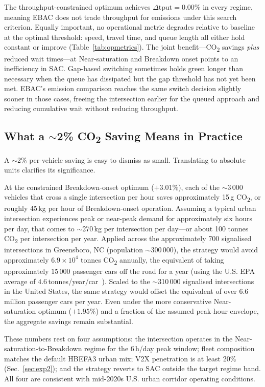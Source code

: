 \documentclass[review,3p,authoryear,times]{elsarticle}
\begin{document}
The throughput-constrained optimum achieves $\Delta\text{tput}=0.00\%$ in
every regime, meaning EBAC does not trade throughput for emissions under this
search criterion. Equally important, no operational metric degrades relative
to baseline at the optimal threshold: speed, travel time, and queue length
all either hold constant or improve (Table~\ref{tab:opmetrics}). The joint
benefit---CO\textsubscript{2} savings \emph{plus} reduced wait times---at
Near-saturation and Breakdown onset points to an inefficiency in SAC.
Gap-based switching sometimes holds green longer than necessary when the
queue has dissipated but the gap threshold has not yet been met. EBAC's
emission comparison reaches the same switch decision slightly sooner in those
cases, freeing the intersection earlier for the queued approach and reducing
cumulative wait without reducing throughput.

\subsection{What a $\sim$2\% CO\textsubscript{2} Saving Means in Practice}
\label{sec:realworld}

A $\sim$2\% per-vehicle saving is easy to dismiss as small. Translating to
absolute units clarifies its significance.

At the constrained Breakdown-onset optimum ($+3.01\%$), each of the
$\sim$3\,000 vehicles that cross a single intersection per hour saves
approximately 15\,g CO\textsubscript{2}, or roughly 45\,kg per hour of
Breakdown-onset operation. Assuming a typical urban intersection experiences
peak or near-peak demand for approximately six hours per day, that comes to
$\sim$270\,kg per intersection per day---or about 100 tonnes
CO\textsubscript{2} per intersection per year. Applied across the
approximately 700 signalised intersections in Greensboro, NC (population
$\sim$300\,000), the strategy would avoid approximately $6.9\times10^{4}$
tonnes CO\textsubscript{2} annually, the equivalent of taking approximately
$15\,000$ passenger cars off the road for a year (using the U.S. EPA
average of $4.6$\,tonnes/year/car~\cite{EPA2023transport}). Scaled to the
$\sim$310\,000 signalised intersections in the United States, the same
strategy would offset the equivalent of over 6.6 million passenger cars per
year. Even under the more conservative Near-saturation optimum ($+1.95\%$)
and a fraction of the assumed peak-hour envelope, the aggregate savings
remain substantial.

These numbers rest on four assumptions: the intersection operates in the
Near-saturation-to-Breakdown regime for the 6\,h/day peak window; fleet
composition matches the default HBEFA3 urban mix; V2X penetration is at
least 20\% (Sec.~\ref{sec:exp2}); and the strategy reverts to SAC outside
the target regime band. All four are consistent with mid-2020s U.S. urban
corridor operating conditions.
\end{document}
